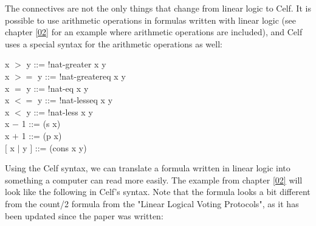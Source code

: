 The connectives are not the only things that change from linear logic to Celf. It is possible to use arithmetic operations in formulas written with linear logic (see chapter \ref{02} for an example where arithmetic operations are included), and Celf uses a special syntax for the arithmetic operations as well:

\begin{texto}
	x $>$ y\hspace{22.8pt} ::= !nat-greater x y \\
	x $>=$ y\hspace{15pt} ::= !nat-greatereq x y \\
	x $=$ y\hspace{22.8pt} ::= !nat-eq x y \\
	x $<=$ y\hspace{15pt} ::= !nat-lesseq x y \\
	x $<$ y\hspace{22.8pt} ::= !nat-less x y \\
 	x $-$ 1\hspace{22.8pt} ::= (s x) \\
 	x $+$ 1\hspace{22.8pt} ::= (p x) \\
	$\lbrack$ x $|$ y $\rbrack$ \hspace{12pt} ::= (cons x y)
\end{texto}

Using the Celf syntax, we can translate a formula written in linear logic into something a computer can read more easily. The example from chapter \ref{02} will look like the following in Celf's syntax. Note that the formula looks a bit different from the count/2 formula from the "{L}inear {L}ogical {V}oting {P}rotocols"\cite{Deyoung11}, as it has been updated since the paper was written:

\begin{textoform}
\end{textoform}


